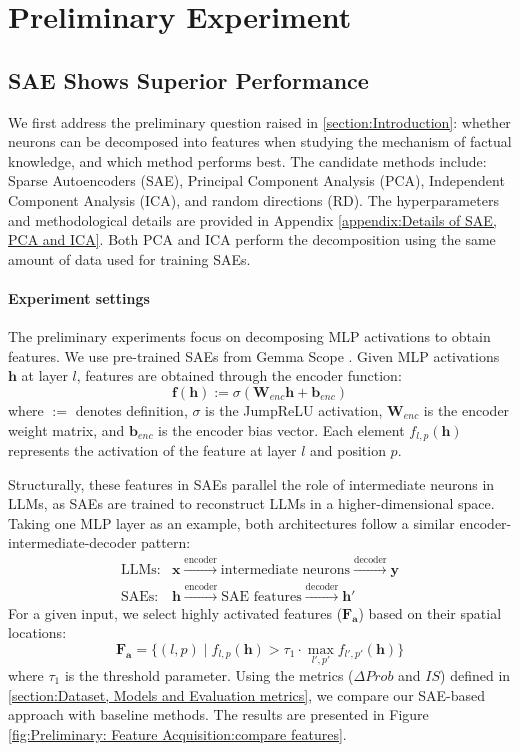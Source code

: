 \section{Preliminary Experiment}
\label{section:preliminary}
\subsection{SAE Shows Superior Performance}
We first address the preliminary question raised in \textsection\ref{section:Introduction}: whether neurons can be decomposed into features when studying the mechanism of factual knowledge, and which method performs best. The candidate methods include: Sparse Autoencoders (SAE), Principal Component Analysis (PCA), Independent Component Analysis (ICA), and random directions (RD).
The hyperparameters and methodological details are provided in Appendix \ref{appendix:Details of SAE, PCA and ICA}. 
Both PCA and ICA perform the decomposition using the same amount of data used for training SAEs. 
\paragraph{Experiment settings}
The preliminary experiments focus on decomposing MLP activations to obtain features. We use pre-trained SAEs from Gemma Scope \cite{lieberum-etal-2024-gemma}. Given MLP activations $\mathbf{h}$ at layer $l$, features are obtained through the encoder function:
\begin{equation}
    \mathbf{f}(\mathbf{h}) := \sigma(\mathbf{W}_{enc}\mathbf{h} + \mathbf{b}_{enc})
\end{equation}
where $:=$ denotes definition, $\sigma$ is the JumpReLU activation, $\mathbf{W}_{enc}$ is the encoder weight matrix, and $\mathbf{b}_{enc}$ is the encoder bias vector. Each element $f_{l,p}(\mathbf{h})$ represents the activation of the feature at layer $l$ and position $p$.

Structurally, these features in SAEs parallel the role of intermediate neurons in LLMs, as SAEs are trained to reconstruct LLMs in a higher-dimensional space. Taking one MLP layer as an example, both architectures follow a similar encoder-intermediate-decoder pattern:
\begin{align}
\label{eq:architecture_comparison}
    \text{LLMs}: & \mathbf{x} \xrightarrow{\text{encoder}} \text{intermediate neurons} \xrightarrow{\text{decoder}} \mathbf{y} \\
    \text{SAEs}: & \mathbf{h} \xrightarrow{\text{encoder}} \text{SAE  features} \xrightarrow{\text{decoder}} \mathbf{h}'
\end{align}
For a given input, we select highly activated features ($\mathbf{F_{a}}$) based on their spatial locations:
\begin{equation}
\label{equation:threshold1}
\mathbf{F_{a}} = \{(l,p) \mid f_{l,p}(\mathbf{h}) > \tau_1 \cdot \max_{l',p'} f_{l',p'}(\mathbf{h})\}
\end{equation}
where $\tau_1$ is the threshold parameter. Using the metrics ($\Delta Prob$ and $IS$) defined in \textsection\ref{section:Dataset, Models and Evaluation metrics}, we compare our SAE-based approach with baseline methods. The results are presented in Figure \ref{fig:Preliminary: Feature Acquisition:compare features}.


